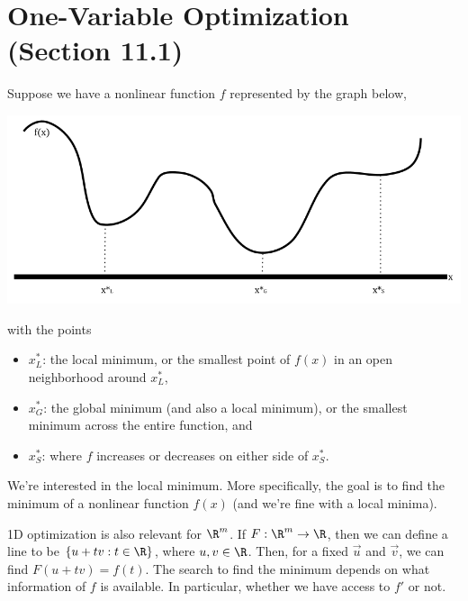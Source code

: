 \documentclass[letterpaper]{article}
\begin{document}
\section{One-Variable Optimization (Section 11.1)}
Suppose we have a nonlinear function $f$ represented by the graph below, 
\begin{center}
    \includegraphics[scale=0.5]{../assets/1varopt_ex.png}
\end{center}
with the points 
\begin{itemize}
    \item $x^*_{L}$: the local minimum, or the smallest point of $f(x)$ in an open neighborhood around $x_{L}^*$,
    \item $x^*_{G}$: the global minimum (and also a local minimum), or the smallest minimum across the entire function, and 
    \item $x^*_{S}$: where $f$ increases or decreases on either side of $x_{S}^*$.
\end{itemize}
We're interested in the local minimum. More specifically, the goal is to find the minimum of a nonlinear function $f(x)$ (and we're fine with a local minima).

\bigskip 

1D optimization is also relevant for $\R^m$. If $F: \R^m \to \R$, then we can define a line to be $\{u + tv : t \in \R\}$, where $u, v \in \R$. Then, for a fixed $\vec{u}$ and $\vec{v}$, we can find $F(u + tv) = f(t)$. The search to find the minimum depends on what information of $f$ is available. In particular, whether we have access to $f'$ or not. 
\end{document}
